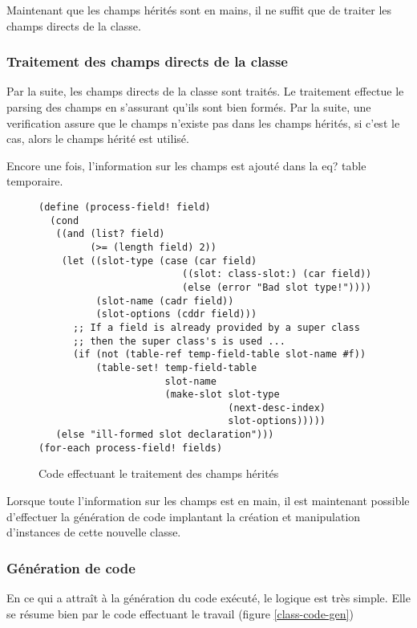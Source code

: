       Maintenant que les champs hérités sont en mains, il ne suffit que de
      traiter les champs directs de la classe.

    \subsubsection{Traitement des champs directs de la classe}
      Par la suite, les champs directs de la classe sont traités. Le
      traitement effectue le \og parsing \fg des champs en s'assurant
      qu'ils sont bien formés. Par la suite, une verification assure
      que le champs n'existe pas dans les champs hérités, si c'est le
      cas, alors le champs hérité est utilisé.

      Encore une fois, l'information sur les champs est ajouté dans la
      \og eq? table \fg temporaire.

      \begin{figure}[h!]
        \begin{lstlisting}
(define (process-field! field)
  (cond
   ((and (list? field)
         (>= (length field) 2))
    (let ((slot-type (case (car field)
                         ((slot: class-slot:) (car field))
                         (else (error "Bad slot type!"))))
          (slot-name (cadr field))
          (slot-options (cddr field)))
      ;; If a field is already provided by a super class
      ;; then the super class's is used ...
      (if (not (table-ref temp-field-table slot-name #f))
          (table-set! temp-field-table
                      slot-name
                      (make-slot slot-type
                                 (next-desc-index)
                                 slot-options)))))
   (else "ill-formed slot declaration")))
(for-each process-field! fields)
        \end{lstlisting}
        \caption{Code effectuant le traitement des champs hérités}
        \label{heritage-code}
      \end{figure}

      Lorsque toute l'information sur les champs est en main, il est
      maintenant possible d'effectuer la génération de code implantant
      la création et manipulation d'instances de cette nouvelle classe.

    \subsubsection{Génération de code}
      En ce qui a attraît à la génération du code exécuté, le logique
      est très simple. Elle se résume bien par le code effectuant le
      travail (figure \ref{class-code-gen})

